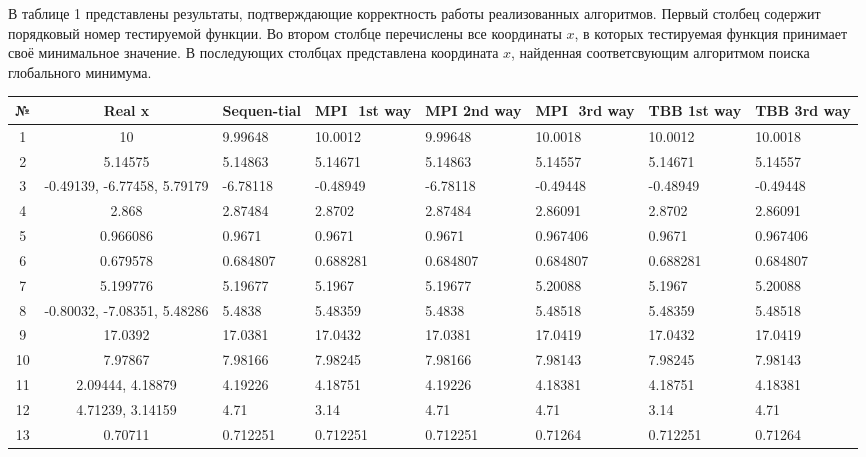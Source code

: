 \documentclass{report}
\begin{document}
В таблице 1 представлены результаты, подтверждающие корректность работы реализованных алгоритмов. Первый столбец содержит порядковый номер тестируемой функции. Во втором столбце перечислены все координаты $x$, в которых тестируемая функция принимает своё минимальное значение. В последующих столбцах представлена координата $x$, найденная соответсвующим алгоритмом поиска глобального минимума. 
\begin{table}[!h]
\begin{center}
\begin{tabular}{ | c | c | p{1.5cm} | p{1.5cm} | p{1.5cm} | p{1.5cm} | p{1.5cm} | p{1.5cm} | }
\hline
№  & Real x                      & Sequen-tial & MPI $  $ 1st way & MPI 2nd way & MPI $  $ 3rd way & TBB 1st way & TBB 3rd way  \\ \hline
1  & 10                          & 9.99648 &  10.0012 & 9.99648 & 10.0018 & 10.0012 & 10.0018  \\ \hline
2  & 5.14575                     & 5.14863 &  5.14671 & 5.14863 & 5.14557 & 5.14671 & 5.14557 \\ \hline
3  & -0.49139, -6.77458, 5.79179 & -6.78118 &  -0.48949 & -6.78118 & -0.49448 & -0.48949 & -0.49448 \\ \hline
4  & 2.868                       & 2.87484 &  2.8702 & 2.87484 & 2.86091 & 2.8702 & 2.86091 \\ \hline
5  & 0.966086                    & 0.9671 &  0.9671 & 0.9671 & 0.967406 & 0.9671 & 0.967406 \\ \hline
6  & 0.679578                    & 0.684807 &  0.688281 & 0.684807 & 0.684807 & 0.688281 & 0.684807 \\ \hline
7  & 5.199776                    & 5.19677 &  5.1967 & 5.19677 & 5.20088 & 5.1967 & 5.20088 \\ \hline
8  & -0.80032, -7.08351, 5.48286 & 5.4838 &  5.48359 & 5.4838 & 5.48518 & 5.48359 & 5.48518 \\ \hline
9  & 17.0392                     & 17.0381 &  17.0432 & 17.0381 & 17.0419 & 17.0432 & 17.0419 \\ \hline
10 & 7.97867                     & 7.98166 &  7.98245 & 7.98166 & 7.98143 & 7.98245 & 7.98143 \\ \hline
11 & 2.09444, 4.18879            & 4.19226 &  4.18751 & 4.19226 & 4.18381 & 4.18751 & 4.18381 \\ \hline
12 & 4.71239, 3.14159            & 4.71 &  3.14 & 4.71 & 4.71 & 3.14 & 4.71 \\ \hline
13 & 0.70711                     & 0.712251 &  0.712251 & 0.712251 & 0.71264 & 0.712251 & 0.71264 \\ \hline

\end{tabular}
\end{center}
\end{table}
\end{document}
